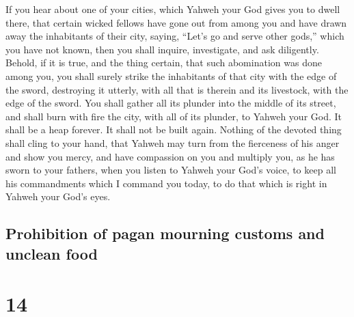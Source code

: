  If you hear about one of your cities, which Yahweh your
God gives you to dwell there, that  certain wicked
fellows have gone out from among you and have drawn away the inhabitants
of their city, saying, ``Let's go and serve other gods,'' which you have
not known,  then you shall inquire, investigate, and ask
diligently. Behold, if it is true, and the thing certain, that such
abomination was done among you,  you shall surely strike
the inhabitants of that city with the edge of the sword, destroying it
utterly, with all that is therein and its livestock, with the edge of
the sword.  You shall gather all its plunder into the
middle of its street, and shall burn with fire the city, with all of its
plunder, to Yahweh your God. It shall be a heap forever. It shall not be
built again.  Nothing of the devoted thing shall cling to
your hand, that Yahweh may turn from the fierceness of his anger and
show you mercy, and have compassion on you and multiply you, as he has
sworn to your fathers,  when you listen to Yahweh your
God's voice, to keep all his commandments which I command you today, to
do that which is right in Yahweh your God's eyes.

\hypertarget{prohibition-of-pagan-mourning-customs-and-unclean-food}{%
\subsection{Prohibition of pagan mourning customs and unclean
food}\label{prohibition-of-pagan-mourning-customs-and-unclean-food}}

\hypertarget{section-13}{%
\section{14}\label{section-13}}

